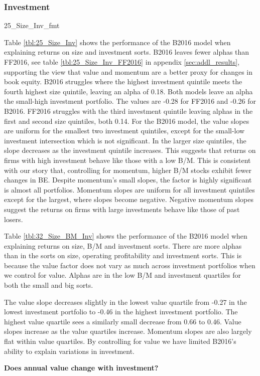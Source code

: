 
\subsubsection{Investment}

{25_Size_Inv_fmt}

Table \ref{tbl:25_Size_Inv} shows the performance of the B2016 model when explaining
returns on size and investment sorts. B2016 leaves fewer alphas than FF2016, see table
\ref{tbl:25_Size_Inv_FF2016} in appendix \ref{sec:addl_results}, supporting the view that
value and momentum are a better proxy for changes in book equity. B2016 struggles where
the highest investment quintile meets the fourth highest size quintile, leaving an alpha
of 0.18. Both models leave an alpha the small-high investment portfolio. The values are
-0.28 for FF2016 and -0.26 for B2016. FF2016 struggles with the third investment quintile
leaving alphas in the first and second  size quintiles, both 0.14. For the B2016 model,
the value slopes are uniform for the smallest two investment quintiles, except for the
small-low investment intersection which is not significant. In the larger size quintiles,
the slope decreases as the investment quintile increases. This suggests that returns on
firms with high investment behave like those with a low B/M. This is consistent with our
story that, controlling for momentum, higher B/M stocks exhibit fewer changes in BE.
Despite momentum's small slopes, the factor is highly significant is almost all
portfolios. Momentum slopes are uniform for all investment quintiles except for the
largest, where slopes become negative. Negative momentum slopes suggest the returns on
firms with large investments behave like those of past losers.

\restoregeometry

Table \ref{tbl:32_Size_BM_Inv} shows the performance of the B2016 model when
explaining returns on size, B/M and investment sorts. There are more alphas than in the
sorts on size, operating profitability and investment sorts. This is because the value
factor does not vary as much across investment portfolios when we control for value.
Alphas are in the low B/M and investment quartiles for both the small and big sorts.

The value slope decreases slightly in the lowest value quartile from -0.27 in the lowest
investment portfolio to -0.46 in the highest investment portfolio. The highest value
quartile sees a similarly small decrease from 0.66 to 0.46. Value slopes increase as the
value quartiles increase. Momentum slopes are also largely flat within value quartiles. By
controlling for value we have limited B2016's ability to explain variations in investment.

\textbf{Does annual value change with investment?}

